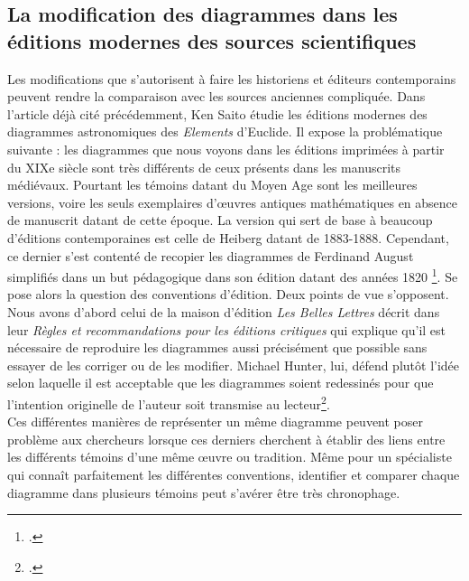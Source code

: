 \subsection{La modification des diagrammes dans les éditions modernes des sources scientifiques}

Les modifications que s'autorisent à faire les historiens et éditeurs contemporains peuvent rendre la comparaison avec les sources anciennes compliquée. Dans l'article déjà cité précédemment, Ken Saito étudie les éditions modernes des diagrammes astronomiques des \textit{Elements} d'Euclide. Il expose la problématique suivante : les diagrammes que nous voyons dans les éditions imprimées à partir du XIXe siècle sont très différents de ceux présents dans les manuscrits médiévaux. Pourtant les témoins datant du Moyen Age sont les meilleures versions, voire les seuls exemplaires d'œuvres antiques mathématiques en absence de manuscrit datant de cette époque. La version qui sert de base à beaucoup d'éditions contemporaines est celle de Heiberg datant de 1883-1888. Cependant, ce dernier s'est contenté de recopier les diagrammes de Ferdinand August simplifiés dans un but pédagogique dans son édition datant des années 1820 \footcite{saitoTraditionsDiagramTradition2012}. Se pose alors la question des conventions d'édition. Deux points de vue s'opposent. Nous avons d'abord celui de la maison d'édition \textit{Les Belles Lettres} décrit dans leur \textit{Règles et recommandations pour les éditions critiques} qui explique qu'il est nécessaire de reproduire les diagrammes aussi précisément que possible sans essayer de les corriger ou de les modifier. Michael Hunter, lui, défend plutôt l'idée selon laquelle il est acceptable que les diagrammes soient redessinés pour que l'intention originelle de l'auteur soit transmise au lecteur\footcite{jardineCriticalEditingEarlyModern2010}.\\

Ces différentes manières de représenter un même diagramme peuvent poser problème aux chercheurs lorsque ces derniers cherchent à établir des liens entre les différents témoins d'une même œuvre ou tradition. Même pour un spécialiste qui connaît parfaitement les différentes conventions, identifier et comparer chaque diagramme dans plusieurs témoins peut s'avérer être très chronophage.

